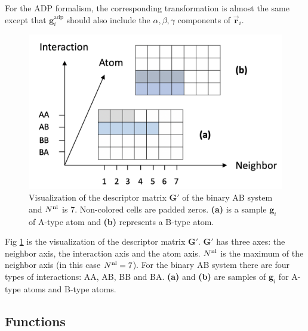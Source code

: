 \documentclass[prb,reprint,superscriptaddress]{revtex4-2}
\begin{document}
For the ADP formalism, the corresponding transformation is almost the same 
except that $\mathbf{g}_{i}^{\mathrm{adp}}$ should also include the 
$\alpha,\beta,\gamma$ components of $\vec{\mathbf{r}}_i$.

% 
%
\begin{figure}
\centering
\includegraphics[scale=0.3]{transformation.png}
\caption{\label{fig:transformation} Visualization of the descriptor matrix 
$\mathbf{G}'$ of the binary AB system and $N^{\mathrm{nl}}$ is 7. Non-colored cells are 
padded zeros. \textbf{(a)} is a sample $\mathbf{g}_i$ of A-type atom and 
\textbf{(b)} represents a B-type atom.}
\end{figure}

Fig \ref{fig:transformation} is the visualization of the descriptor matrix 
$\mathbf{G}'$. $\mathbf{G}'$ has three axes: the neighbor axis, the interaction 
axis and the atom axis. $N^{\mathrm{nl}}$ is the maximum of the neighbor axis (in this case 
$N^{\mathrm{nl}} = 7$). For the binary AB system there are four types of interactions: AA, 
AB, BB and BA. \textbf{(a)} and \textbf{(b)} are samples of $\mathbf{g}_i$ for 
A-type atoms and B-type atoms.

\subsection{Functions}
\label{sec:functions}
\end{document}
